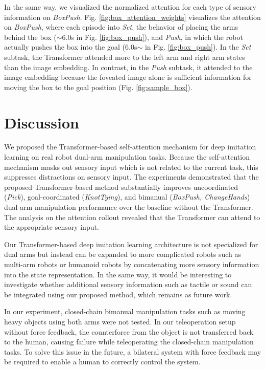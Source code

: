 \documentclass[letterpaper, 10 pt, conference]{ieeeconf}  %
\renewcommand\hl[1]{#1} %
\begin{document}
In the same way, we visualized the \hl{normalized attention} for each type of sensory information on \textit{BoxPush}. Fig. \ref{fig:box_attention_weights} visualizes the \hl{attention} on \textit{BoxPush}, where each episode into \textit{Set}, the behavior of placing the arms behind the box ($\sim6.0$s in Fig. {\ref{fig:box_push}}), and \textit{Push}, in which the robot actually pushes the box into the goal ($6.0$s$\sim$ in Fig. \ref{fig:box_push}). 
In the \textit{Set} subtask, the Transformer attended more to the left arm and right arm states than the image embedding. In contrast, in the \textit{Push} subtask, it attended to the image embedding because the foveated image alone is sufficient information for moving the box to the goal position (Fig. \ref{fig:sample_box}).


\section{Discussion}
We proposed the Transformer-based self-attention mechanism for deep imitation learning on real robot dual-arm manipulation tasks. \hl{Because the self-attention mechanism masks out sensory input which is not related to the current task, this suppresses distractions on sensory input.}
The experiments demonstrated that the proposed Transformer-based method substantially improves uncoordinated (\textit{Pick}), goal-coordinated (\textit{KnotTying}), and bimanual (\textit{BoxPush, ChangeHands}) dual-arm manipulation performance over the baseline without the Transformer. The analysis on the attention rollout revealed that the Transformer can attend to the appropriate sensory input.

Our Transformer-based deep imitation learning architecture is not specialized for dual arms but instead can be expanded to more complicated robots such as multi-arm robots or humanoid robots by concatenating more sensory information into the state representation. 
In the same way, it would be interesting to investigate whether additional sensory information such as tactile or sound can be integrated using our proposed method, which remains as future work.

In our experiment, closed-chain bimanual manipulation tasks such as moving heavy objects using both arms were not tested. In our teleoperation setup without force feedback, the counterforce from the object is not transferred back to the human, causing failure while teleoperating the closed-chain manipulation tasks. To solve this issue in the future, a bilateral system with force feedback may be required to enable a human to correctly control the system.




\end{document}

